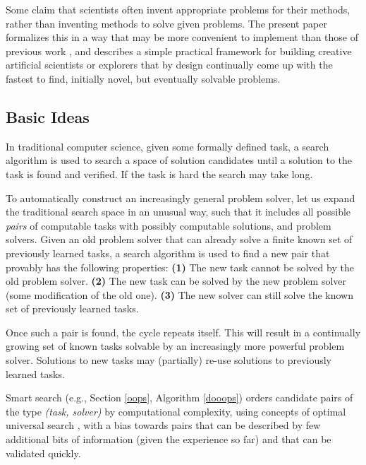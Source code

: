 \documentclass{article}
\begin{document}
Some claim that scientists often invent appropriate problems for their methods,
rather than inventing methods to solve given problems. The present paper
formalizes this in a way that may be more convenient to implement
than those of previous work \cite{Schmidhuber:91singaporecur,Schmidhuber:99cec,Schmidhuber:06cs,Schmidhuber:10ieeetamd}, 
and describes a simple practical framework for building
creative artificial scientists or explorers that by design continually 
come up with the fastest to find, initially novel, but eventually solvable problems.

\subsection{Basic Ideas}
\label{idea}

In traditional computer science, given some formally defined task, 
a search algorithm is used to search a space of solution 
candidates until a solution to the task is found and verified.
If the task is hard the search may take long.

To automatically construct an increasingly general problem solver,
let us expand the traditional search space in an unusual way, 
such that it includes all possible {\em pairs} of computable tasks with possibly computable solutions, and problem solvers.
Given an old problem solver that can already solve a finite known set of previously learned tasks,
a search algorithm is used to find a new pair that provably has the following properties:
{\bf (1)} The new task cannot be solved by the old problem solver.
{\bf (2)} The new task can be solved by the new problem solver (some modification of the old one).
{\bf (3)}  The new solver can still solve the known set of previously learned tasks.

Once such a pair is found, the cycle repeats itself. This will result in a continually 
growing set of known tasks solvable by an increasingly more powerful problem solver.
 Solutions to new tasks may (partially) re-use solutions to previously learned tasks.



Smart search (e.g., Section \ref{oops}, Algorithm  \ref{dooops})
orders candidate pairs of the type {\em (task, solver)}
 by computational complexity, using concepts of 
optimal universal search \cite{Levin:73,Schmidhuber:04oops},
 with a bias towards pairs that can be described by few additional
bits of information (given the experience so far)
and that can be validated quickly.
\end{document}
